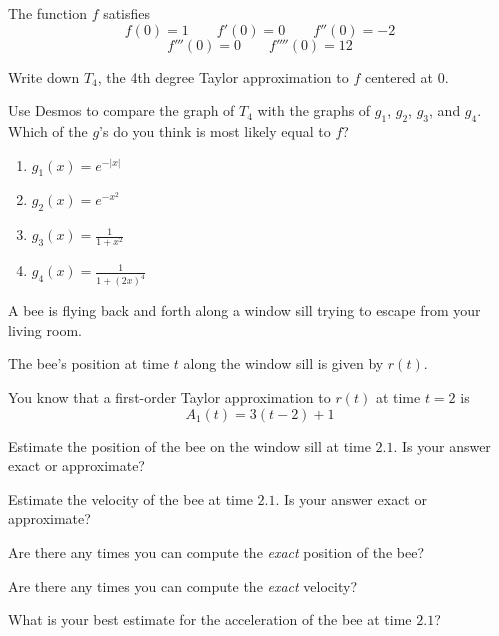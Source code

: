 \documentclass{workbook}
\begin{document}
\begin{slide}
	\question
	The function $f$ satisfies
	\[f(0)= 1\qquad f'(0)=0\qquad f''(0)=-2\]\[ f'''(0)=0\qquad f''''(0)=12\]

	\begin{parts}
		\item Write down $T_4$, the 4th degree Taylor approximation to $f$ centered at $0$.
		\item Use Desmos to compare the graph of $T_4$ with the graphs of $g_1$,
		$g_2$, $g_3$, and $g_4$. Which of the $g$'s do you think is most likely equal to $f$?
		\begin{enumerate}
			\item $g_1(x)=e^{-|x|}$
			\item $g_2(x)=e^{-x^2}$
			\item $\displaystyle g_3(x)=\frac{1}{1+x^2}$
			\item $\displaystyle g_4(x)=\frac{1}{1+(2x)^4}$
		\end{enumerate}
	\end{parts}

\end{slide}



\begin{slide}
	\question
	A bee is flying back and forth along a window sill trying to escape from your living room. 

	The bee's position at time $t$ along the window sill is given by $r(t)$.

	You know that a first-order Taylor approximation to $r(t)$ at time $t=2$
	is
	\[
		A_1(t)=3(t-2)+1
	\]

	\begin{parts}
		\item Estimate the position of the bee on the window sill at time 
		$2.1$. Is your answer exact or approximate?
		\item Estimate the velocity of the bee at time $2.1$. Is your answer exact or approximate?
		\item Are there any times you can compute the \emph{exact} position of the bee?
		\item Are there any times you can compute the \emph{exact} velocity?
		\item What is your best estimate for the acceleration of the 
		bee at time $2.1$?
	\end{parts}
\end{slide}
\end{document}

